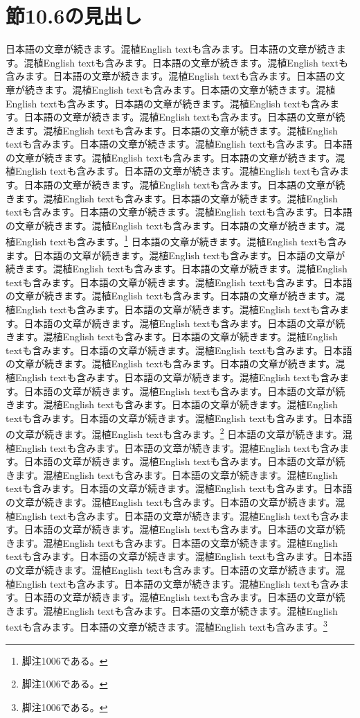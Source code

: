 \documentclass[pdflatex,book]{jlreq}
\begin{document}
\section{節10.6の見出し}
日本語の文章が続きます。混植English textも含みます。日本語の文章が続きます。混植English textも含みます。日本語の文章が続きます。混植English textも含みます。日本語の文章が続きます。混植English textも含みます。日本語の文章が続きます。混植English textも含みます。日本語の文章が続きます。混植English textも含みます。日本語の文章が続きます。混植English textも含みます。日本語の文章が続きます。混植English textも含みます。日本語の文章が続きます。混植English textも含みます。日本語の文章が続きます。混植English textも含みます。日本語の文章が続きます。混植English textも含みます。日本語の文章が続きます。混植English textも含みます。日本語の文章が続きます。混植English textも含みます。日本語の文章が続きます。混植English textも含みます。日本語の文章が続きます。混植English textも含みます。日本語の文章が続きます。混植English textも含みます。日本語の文章が続きます。混植English textも含みます。日本語の文章が続きます。混植English textも含みます。日本語の文章が続きます。混植English textも含みます。日本語の文章が続きます。混植English textも含みます。\footnote{脚注1006である。}
日本語の文章が続きます。混植English textも含みます。日本語の文章が続きます。混植English textも含みます。日本語の文章が続きます。混植English textも含みます。日本語の文章が続きます。混植English textも含みます。日本語の文章が続きます。混植English textも含みます。日本語の文章が続きます。混植English textも含みます。日本語の文章が続きます。混植English textも含みます。日本語の文章が続きます。混植English textも含みます。日本語の文章が続きます。混植English textも含みます。日本語の文章が続きます。混植English textも含みます。日本語の文章が続きます。混植English textも含みます。日本語の文章が続きます。混植English textも含みます。日本語の文章が続きます。混植English textも含みます。日本語の文章が続きます。混植English textも含みます。日本語の文章が続きます。混植English textも含みます。日本語の文章が続きます。混植English textも含みます。日本語の文章が続きます。混植English textも含みます。日本語の文章が続きます。混植English textも含みます。日本語の文章が続きます。混植English textも含みます。日本語の文章が続きます。混植English textも含みます。\footnote{脚注1006である。}
日本語の文章が続きます。混植English textも含みます。日本語の文章が続きます。混植English textも含みます。日本語の文章が続きます。混植English textも含みます。日本語の文章が続きます。混植English textも含みます。日本語の文章が続きます。混植English textも含みます。日本語の文章が続きます。混植English textも含みます。日本語の文章が続きます。混植English textも含みます。日本語の文章が続きます。混植English textも含みます。日本語の文章が続きます。混植English textも含みます。日本語の文章が続きます。混植English textも含みます。日本語の文章が続きます。混植English textも含みます。日本語の文章が続きます。混植English textも含みます。日本語の文章が続きます。混植English textも含みます。日本語の文章が続きます。混植English textも含みます。日本語の文章が続きます。混植English textも含みます。日本語の文章が続きます。混植English textも含みます。日本語の文章が続きます。混植English textも含みます。日本語の文章が続きます。混植English textも含みます。日本語の文章が続きます。混植English textも含みます。日本語の文章が続きます。混植English textも含みます。\footnote{脚注1006である。}
\end{document}
